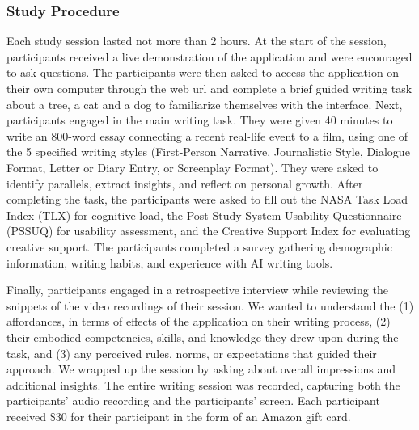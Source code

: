 \subsubsection{Study Procedure}
Each study session lasted not more than 2 hours. At the start of the session, participants received a live demonstration of the application and were encouraged to ask questions. The participants were then asked to access the application on their own computer through the web url and complete a brief guided writing task about a tree, a cat and a dog to familiarize themselves with the interface. Next, participants engaged in the main writing task. They were given 40 minutes to write an 800-word essay connecting a recent real-life event to a film, using one of the 5 specified writing styles (First-Person Narrative, Journalistic Style, Dialogue Format, Letter or Diary Entry, or Screenplay Format). They were asked to identify parallels, extract insights, and reflect on personal growth. After completing the task, the participants were asked to fill out the NASA Task Load Index (TLX) for cognitive load, the Post-Study System Usability Questionnaire (PSSUQ) for usability assessment, and the Creative Support Index for evaluating creative support. The participants completed a survey gathering demographic information, writing habits, and experience with AI writing tools. 

Finally, participants engaged in a retrospective interview while reviewing the snippets of the video recordings of their session. We wanted to understand the (1) affordances, in terms of effects of the application on their writing process,  (2) their embodied competencies, skills, and knowledge they drew upon during the task, and (3) any perceived rules, norms, or expectations that guided their approach. We wrapped up the session by asking about overall impressions and additional insights. The entire writing session was recorded, capturing both the participants' audio recording and the participants' screen. Each participant received \$30 for their participant in the form of an Amazon gift card.


